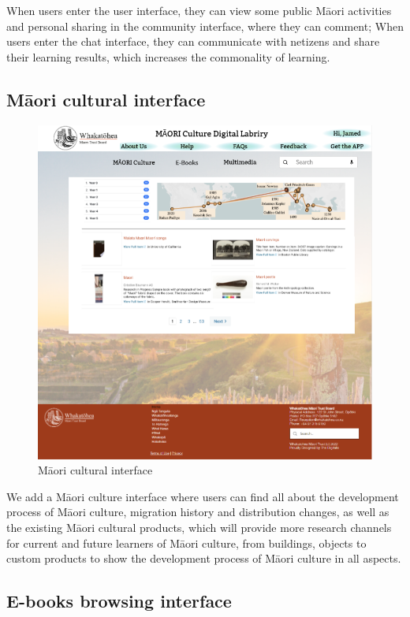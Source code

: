 When users enter the user interface, they can view some public Māori activities and personal sharing in the community interface, where they can comment; When users enter the chat interface, they can communicate with netizens and share their learning results, which increases the commonality of learning.

\subsection{Māori cultural interface}

\begin{figure}[htbp]
  \centerline{\includegraphics[width=400pt]{images/3-1-3.png}}
  \caption{Māori cultural interface}
  \label{fig30}
\end{figure}

We add a Māori culture interface where users can find all about the development process of Māori culture, migration history and distribution changes, as well as the existing Māori cultural products, which will provide more research channels for current and future learners of Māori culture, from buildings, objects to custom products to show the development process of Māori culture in all aspects\cite{MāoriCul4:online}.

\subsection{E-books browsing interface}

